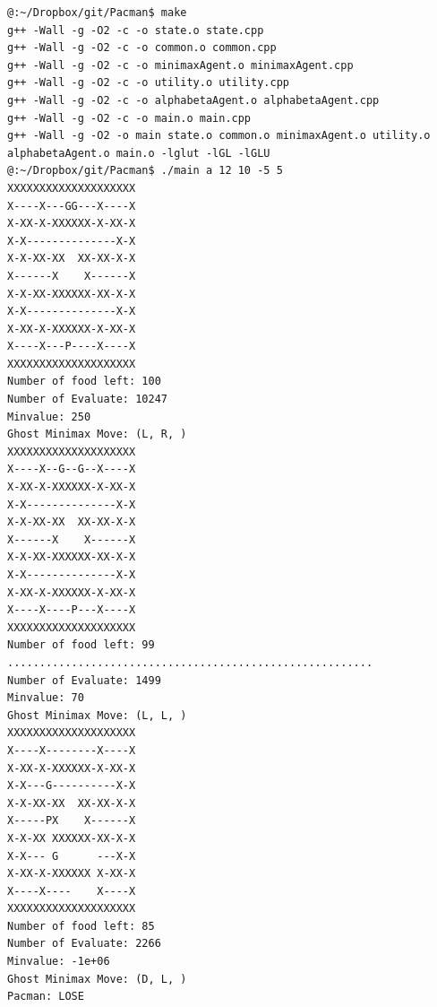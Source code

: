 \documentclass[a4paper, 11pt]{article}
\begin{document}
\begin{verbatim}
@:~/Dropbox/git/Pacman$ make
g++ -Wall -g -O2 -c -o state.o state.cpp
g++ -Wall -g -O2 -c -o common.o common.cpp
g++ -Wall -g -O2 -c -o minimaxAgent.o minimaxAgent.cpp
g++ -Wall -g -O2 -c -o utility.o utility.cpp
g++ -Wall -g -O2 -c -o alphabetaAgent.o alphabetaAgent.cpp
g++ -Wall -g -O2 -c -o main.o main.cpp
g++ -Wall -g -O2 -o main state.o common.o minimaxAgent.o utility.o alphabetaAgent.o main.o -lglut -lGL -lGLU
@:~/Dropbox/git/Pacman$ ./main a 12 10 -5 5
XXXXXXXXXXXXXXXXXXXX
X----X---GG---X----X
X-XX-X-XXXXXX-X-XX-X
X-X--------------X-X
X-X-XX-XX  XX-XX-X-X
X------X    X------X
X-X-XX-XXXXXX-XX-X-X
X-X--------------X-X
X-XX-X-XXXXXX-X-XX-X
X----X---P----X----X
XXXXXXXXXXXXXXXXXXXX
Number of food left: 100
Number of Evaluate: 10247
Minvalue: 250
Ghost Minimax Move: (L, R, )
XXXXXXXXXXXXXXXXXXXX
X----X--G--G--X----X
X-XX-X-XXXXXX-X-XX-X
X-X--------------X-X
X-X-XX-XX  XX-XX-X-X
X------X    X------X
X-X-XX-XXXXXX-XX-X-X
X-X--------------X-X
X-XX-X-XXXXXX-X-XX-X
X----X----P---X----X
XXXXXXXXXXXXXXXXXXXX
Number of food left: 99
.........................................................
Number of Evaluate: 1499
Minvalue: 70
Ghost Minimax Move: (L, L, )
XXXXXXXXXXXXXXXXXXXX
X----X--------X----X
X-XX-X-XXXXXX-X-XX-X
X-X---G----------X-X
X-X-XX-XX  XX-XX-X-X
X-----PX    X------X
X-X-XX XXXXXX-XX-X-X
X-X--- G      ---X-X
X-XX-X-XXXXXX X-XX-X
X----X----    X----X
XXXXXXXXXXXXXXXXXXXX
Number of food left: 85
Number of Evaluate: 2266
Minvalue: -1e+06
Ghost Minimax Move: (D, L, )
Pacman: LOSE
\end{verbatim}
\end{document}
